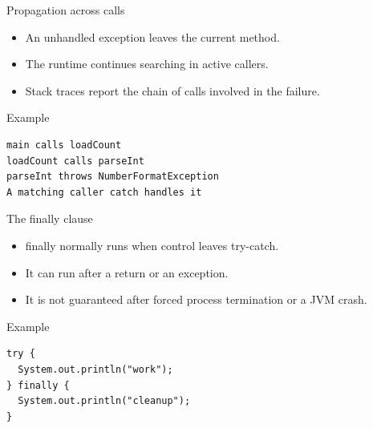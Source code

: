 \documentclass[10pt,aspectratio=169]{beamer}
\begin{document}
\begin{frame}[fragile,t]{Propagation across calls}
\begin{itemize}
\item An unhandled exception leaves the current method.
\item The runtime continues searching in active callers.
\item Stack traces report the chain of calls involved in the failure.
\end{itemize}
\vspace{1mm}\begin{block}{Example}
\begin{lstlisting}
main calls loadCount
loadCount calls parseInt
parseInt throws NumberFormatException
A matching caller catch handles it
\end{lstlisting}
\end{block}
\end{frame}

\begin{frame}[fragile,t]{The finally clause}
\begin{itemize}
\item finally normally runs when control leaves try-catch.
\item It can run after a return or an exception.
\item It is not guaranteed after forced process termination or a JVM crash.
\end{itemize}
\vspace{1mm}\begin{block}{Example}
\begin{lstlisting}
try {
  System.out.println("work");
} finally {
  System.out.println("cleanup");
}
\end{lstlisting}
\end{block}
\end{frame}
\end{document}

